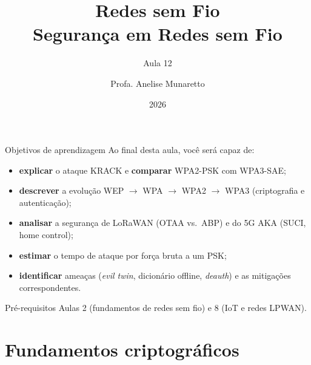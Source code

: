 \documentclass[aspectratio=169,11pt]{beamer}
\title[Redes sem Fio]{Redes sem Fio\\ Segurança em Redes sem Fio}
\subtitle{Aula 12}
\author[Anelise Munaretto]{Profa. Anelise Munaretto}
\institute[Curso]{Redes sem Fio --- Ciência da Computação}
\date{2026}
\begin{document}
\begin{frame}[plain]
  \titlepage
\end{frame}

\begin{frame}{Objetivos de aprendizagem}
  Ao final desta aula, você será capaz de:
  \begin{itemize}
    \item \textbf{explicar} o ataque KRACK e \textbf{comparar} WPA2-PSK com WPA3-SAE;
    \item \textbf{descrever} a evolução WEP $\rightarrow$ WPA $\rightarrow$ WPA2 $\rightarrow$ WPA3 (criptografia e autenticação);
    \item \textbf{analisar} a segurança de LoRaWAN (OTAA vs.\ ABP) e do 5G AKA (SUCI, home control);
    \item \textbf{estimar} o tempo de ataque por força bruta a um PSK;
    \item \textbf{identificar} ameaças (\emph{evil twin}, dicionário offline, \emph{deauth}) e as mitigações correspondentes.
  \end{itemize}
  \begin{alertblock}{Pré-requisitos}
    Aulas 2 (fundamentos de redes sem fio) e 8 (IoT e redes LPWAN).
  \end{alertblock}
\end{frame}

\section{Fundamentos criptográficos}
\end{document}
